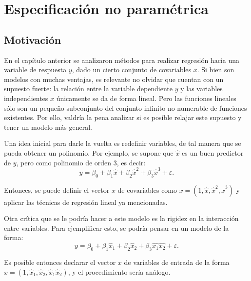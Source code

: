 \chapter[Especificaci\'on no param\'etrica]{Especificaci\'on no param\'etrica}

\section{Motivaci\'on}

En el cap\'itulo anterior se analizaron m\'etodos para realizar regresi\'on hacia una variable de respuesta $y$, dado un cierto conjunto de covariables $x$. Si bien son modelos con muchas ventajas, es relevante no olvidar que cuentan con un supuesto fuerte: la relación entre la variable dependiente $y$ y las variables independientes $x$ \'unicamente se da de forma lineal. Pero las funciones lineales s\'olo son un pequeño subconjunto del conjunto infinito no-numerable de funciones existentes. Por ello, valdr\'ia la pena analizar si es posible relajar este supuesto y tener un modelo m\'as general.

Una idea inicial para darle la vuelta es redefinir variables, de tal manera que se pueda obtener un polinomio. Por ejemplo, se supone que $\hat{x}$ es un buen predictor de $y$, pero como polinomio de orden 3, es decir:
\begin{equation*}
    y = \beta_0 + \beta_1\hat{x} + \beta_2\hat{x}^2 + \beta_3\hat{x}^3 + \varepsilon.
\end{equation*}

Entonces, se puede definir el vector $x$ de covariables como $x = (1,\hat{x},\hat{x}^2,\hat{x}^3)$ y aplicar las t\'ecnicas de regresi\'on lineal ya mencionadas.

Otra cr\'itica que se le podr\'ia hacer a este modelo es la rigidez en la interacci\'on entre variables. Para ejemplificar esto, se podr\'ia pensar en un modelo de la forma:
\begin{equation*}
    y = \beta_0 + \beta_1\hat{x}_1 + \beta_2\hat{x}_2 + \beta_3\hat{x_1}\hat{x_2} + \varepsilon.
\end{equation*}

Es posible entonces declarar el vector $x$ de variables de entrada de la forma $x = (1,\hat{x}_1,\hat{x}_2,\hat{x}_1\hat{x}_2)$, y el procedimiento ser\'ia an\'alogo.


